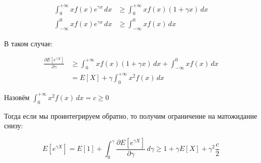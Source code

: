\documentclass[12pt, a4paper]{article}
\newcounter{casenum}
\newenvironment{caseof}{\setcounter{casenum}{1}}{\vskip.5\baselineskip}
\newcommand{\case}[2]{\vskip.5\baselineskip\par\noindent {\bfseries Случай \arabic{casenum}:} #1\\#2\addtocounter{casenum}{1}}
\theoremstyle{remark}
\begin{document}
\begin{align*}
    \int_{0}^{+\infty} x f(x) e^{\gamma x} \, dx &\geq \int_{0}^{+\infty} x f(x) (1 + \gamma x)\, dx    \\
    \int_{-\infty}^{0} x f(x) e^{\gamma x} \, dx &\geq \int_{-\infty}^{0} x f(x)\, dx    
\end{align*}

В таком случае:

\begin{align*}
\frac{\partial E[e^{\gamma X}]}{\partial \gamma} &\geq  \int_{0}^{+\infty} x f(x) (1 + \gamma x)\, dx + \int_{-\infty}^{0} x f(x)\, dx  \\
&= E[X] + \gamma \int_{0}^{+\infty} x^2 f(x) \, dx
\end{align*}

Назовём $\int_{0}^{+\infty} x^2 f(x) \, dx = c \geq 0$

Тогда если мы проинтегрируем обратно, то получим ограничение на матожидание снизу:

\[
E[e^{\gamma X}] = E[1] + \int_0^\gamma \frac{\partial E[e^{\gamma X}]}{\partial \gamma} \, d\gamma \geq 1 + \gamma E[X] + \gamma^2 \frac{c}{2}    
\]


        

        




\end{document}
